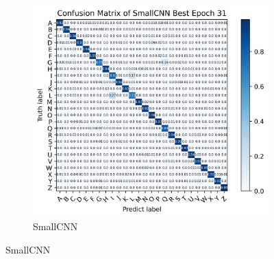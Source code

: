 \documentclass{article}
\begin{document}
\begin{figure}[!ht]
\begin{subfigure}{0.45\textwidth}
        \includegraphics[width=\linewidth]{confusion_matrix_smallcnn.png}
        \caption{SmallCNN}
        \label{fig:sub2}
    \end{subfigure}
    

\end{figure}
\end{document}

